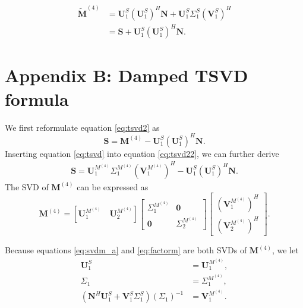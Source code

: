 \begin{equation}
\label{eq:tsvd2}
\begin{split}
\tilde{\mathbf{M}}^{(4)} &= \mathbf{U}_1^S(\mathbf{U}_1^S)^H\mathbf{N} + \mathbf{U}_1^S\Sigma_1^S(\mathbf{V}_1^S)^H \\
 &=\mathbf{S} + \mathbf{U}_1^S(\mathbf{U}_1^S)^H\mathbf{N}.
\end{split}
\end{equation}








\newpage
\appendix
\section{Appendix B: Damped TSVD formula}
We first reformulate equation \ref{eq:tsvd2} as
\begin{equation}
\label{eq:tsvd22}
\mathbf{S} = \mathbf{M}^{(4)} -\mathbf{U}_1^S(\mathbf{U}_1^S)^H\mathbf{N}.
\end{equation}
Inserting equation \ref{eq:tsvd} into equation \ref{eq:tsvd22}, we can further derive 
\begin{equation}
\label{eq:tsvd222}
\begin{split}
\mathbf{S} = \mathbf{U}_1^{M^{(4)}}\Sigma_1^{M^{(4)}}(\mathbf{V}_1^{M^{(4)}})^H -\mathbf{U}_1^S(\mathbf{U}_1^S)^H\mathbf{N}.
\end{split}
\end{equation}
The SVD of $\mathbf{M}^{(4)}$ can be expressed as
\begin{equation}
\label{eq:svdm_a}
\mathbf{M}^{(4)} = [\mathbf{U}_1^{M^{(4)}}\quad \mathbf{U}_2^{M^{(4)}}]\left[\begin{array}{cc}
\Sigma_1^{M^{(4)}} & \mathbf{0}\\
\mathbf{0} & \Sigma_2^{M^{(4)}}
\end{array}
\right]\left[\begin{array}{c}
(\mathbf{V}_1^{M^{(4)}})^H\\
(\mathbf{V}_2^{M^{(4)}})^H
\end{array}
\right].
\end{equation}

Because equations \ref{eq:svdm_a} and \ref{eq:factorm} are both SVDs of $\mathbf{M}^{(4)}$, we let
\begin{align}
\label{eq:equal1}
\mathbf{U}_1^S&=\mathbf{U}_1^{M^{(4)}}, \\
\label{eq:equal3}
\Sigma_1&=\Sigma_1^{M^{(4)}}, \\
\label{eq:equal2}
(\mathbf{N}^H\mathbf{U}_1^S+\mathbf{V}_1^S\Sigma_1^S)(\Sigma_1)^{-1}&=\mathbf{V}_1^{M^{(4)}}.
\end{align}


